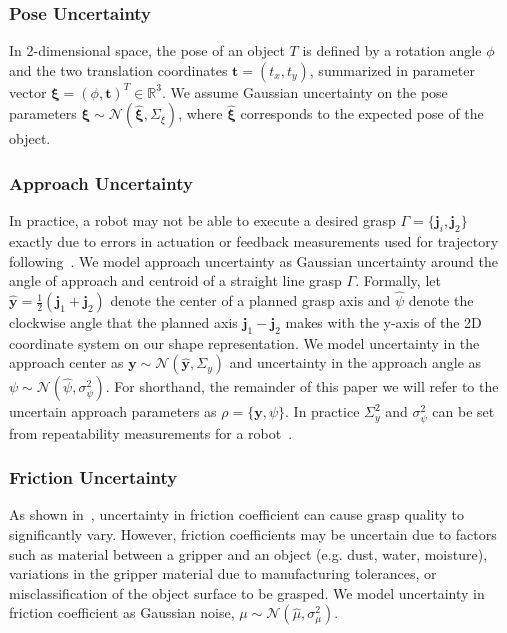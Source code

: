 \documentclass[10pt, conference]{ieeeconf}      %
\newcommand{\bj}{\mathbf{j}}
\newcommand{\bt}{\mathbf{t}}
\newcommand{\by}{\mathbf{y}}
\newcommand{\mN}{\mathcal{N}}
\begin{document}
\subsubsection{Pose Uncertainty}
In 2-dimensional space, the pose of an object $T$ is defined by a rotation angle $\phi$ and the two translation coordinates $\bt = (t_x, t_y)$, summarized in parameter vector $\mathbf{\xi} = (\phi, \bt)^T \in \mathbb{R}^3$.  We assume Gaussian uncertainty on the pose parameters $\mathbf{\xi} \sim \mN \left( \hat{\mathbf{\xi}}, \Sigma_{\xi} \right)$, where $\hat{\mathbf{\xi}}$ corresponds to the expected pose of the object. 

 
 \subsubsection{Approach Uncertainty}
In practice, a robot may not be able to execute a desired grasp $\Gamma = \lbrace \bj_i,\bj_2\rbrace$ exactly due to errors in actuation or feedback measurements used for trajectory following~\cite{kehoe2012estimating}.
We model approach uncertainty as Gaussian uncertainty around the angle of approach and centroid of a straight line grasp $\Gamma$.
Formally, let $\hat{\by} = \frac{1}{2} (\bj_1 + \bj_2)$ denote the center of a planned grasp axis and $\hat{\psi}$ denote the clockwise angle that the planned axis $\bj_1 - \bj_2$ makes with the y-axis of the 2D coordinate system on our shape representation.
We model uncertainty in the approach center as $\by \sim \mN(\hat{\by}, \Sigma_y)$ and uncertainty in the approach angle as $\psi \sim \mN(\hat{\psi}, \sigma_{\psi}^2)$.
For shorthand, the remainder of this paper we will refer to the uncertain approach parameters as $\rho = \{\by, \psi \}$.
In practice $\Sigma_{y}^2$ and $\sigma_{\psi}^2$ can be set from repeatability measurements for a robot~\cite{mooring1986determination}.

 \subsubsection{Friction Uncertainty}
As shown in~\cite{hang2013a,zheng2005}, uncertainty in friction coefficient can cause grasp quality to significantly vary.
However, friction coefficients may be uncertain due to factors such as material between a gripper and an object (e.g. dust, water, moisture), variations in the gripper material due to manufacturing tolerances, or misclassification of the object surface to be grasped.
We model uncertainty in friction coefficient as Gaussian noise, $\mu \sim \mN(\hat{\mu},\sigma_{\mu}^2)$.
\end{document}
